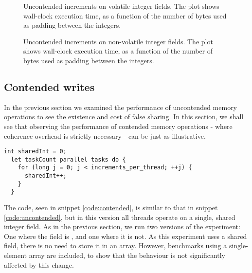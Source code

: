 \begin{figure}[hbpt]
\graphicspath{{plots/}}

\caption{Uncontended increments on volatile integer fields. The plot shows wall-clock
	execution time, as a function of the number of bytes used as padding
	between the integers.}
	\label{fig:uncont}
\end{figure}

\begin{figure}[hbpt]
\graphicspath{{plots/}}

\caption{Uncontended increments on non-volatile integer fields. The plot shows
	wall-clock execution time, as a function of the number of bytes used as padding
	between the integers.}
\label{fig:uncont-nob}
\end{figure}


\subsection{Contended writes}

In the previous section we examined the performance of uncontended memory
operations to see the existence and cost of false sharing. In this section, we
shall see that observing the performance of contended memory operations - where
coherence overhead is strictly necessary - can be just as illustrative.

\begin{code}[hbtp]
\begin{Verbatim}[frame=single]
  int sharedInt = 0;
  let taskCount parallel tasks do {
    for (long j = 0; j < increments_per_thread; ++j) {
      sharedInt++;
    }
  }
\end{Verbatim}
	\caption{Simplified code for the local-field version of the contended-writes
	experiment.}
	\label{code:contended}
\end{code}

The code, seen in snippet \ref{code:contended}, is similar to that in snippet \ref{code:uncontended}, but in this
version all threads operate on a single, shared integer field. As in the previous
section, we run two versions of the experiment: One where the field is
, and one where it is not. As this experiment uses a shared field,
there is no need to store it in an array. However, benchmarks using a
single-element array are included, to show that the behaviour is not
significantly affected by this change.

